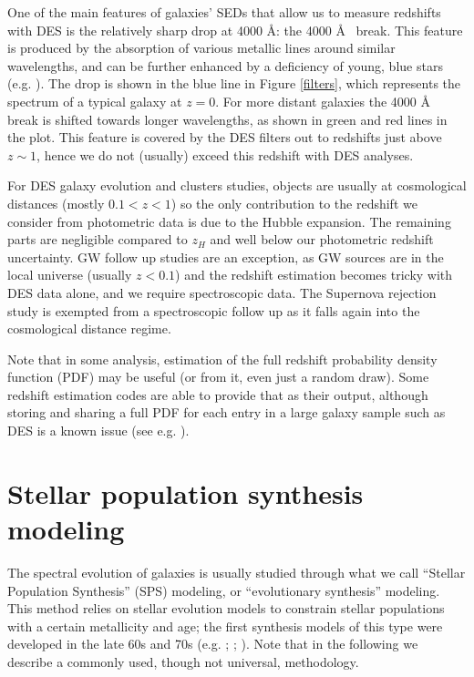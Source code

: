 One of the main features of galaxies' SEDs that allow us to measure redshifts with DES is the relatively sharp drop at 4000 \AA: the 4000 \AA~ break. This feature is produced by the absorption of various metallic lines around similar wavelengths, and can be further enhanced by a deficiency of young, blue stars (e.g. \citealt{1985ApJ...297..371H}). The drop is shown in the blue line in Figure \ref{filters}, which represents the spectrum of a typical galaxy at $z=0$. For more distant galaxies the 4000 \AA~ break is shifted towards longer wavelengths, as shown in green and red lines in the plot. This feature is covered by the DES filters out to redshifts just above $z\sim 1$, hence we do not (usually) exceed this redshift with DES analyses.

For DES galaxy evolution and clusters studies, objects are usually at cosmological distances (mostly $0.1<z<1$) so the only contribution to the redshift we consider from photometric data is due to the Hubble expansion. The remaining parts are negligible compared to $z_H$ and well below our photometric redshift uncertainty. GW follow up studies are an exception, as GW sources are in the local universe (usually $z<0.1$) and the redshift estimation becomes tricky with DES data alone, and we require spectroscopic data. The Supernova rejection study is exempted from a spectroscopic follow up as it falls again into the cosmological distance regime.

Note that in some analysis, estimation of the full redshift probability density function (PDF) may be useful (or from it, even just a random draw). Some redshift estimation codes are able to provide that as their output, although storing and sharing a full PDF for each entry in a large galaxy sample such as DES is a known issue (see e.g. \citealt{rau}).

\section{Stellar population synthesis modeling}\label{sec:SPS}
The spectral evolution of galaxies is usually studied through what we call ``Stellar Population Synthesis'' (SPS) modeling, or ``evolutionary synthesis'' modeling. This method relies on stellar evolution models to constrain stellar populations with a certain metallicity and age; the first synthesis models of this type were developed in the late 60s and 70s (e.g. \citealt{tinsley}; \citealt{tinsley72}; \citealt{searle}).  Note that in the following we describe a commonly used, though not universal, methodology. 

